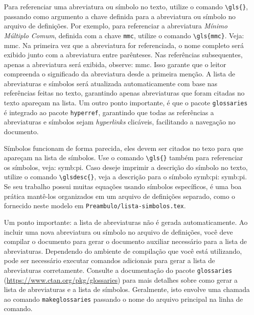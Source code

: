 Para referenciar uma abreviatura ou símbolo no texto, utilize o comando \verb|\gls{}|, passando como
argumento a chave definida para a abreviatura ou símbolo no arquivo de definições. Por exemplo, para
referenciar a abreviatura \emph{Mínimo Múltiplo Comum}, definida com a chave \texttt{mmc}, utilize o
comando \verb|\gls{mmc}|. Veja: \gls{mmc}. Na primeira vez que a abreviatura for referenciada, o
nome completo será exibido junto com a abreviatura entre parênteses. Nas referências subsequentes,
apenas a abreviatura será exibida, observe: \gls{mmc}. Isso garante que o leitor compreenda o
significado da abreviatura desde a primeira menção. A lista de abreviaturas e símbolos será
atualizada automaticamente com base nas referências feitas no texto, garantindo apenas abreviaturas
que foram citadas no texto apareçam na lista. Um outro ponto importante, é que o pacote
\texttt{glossaries} é integrado ao pacote \texttt{hyperref}, garantindo que todas as referências a
abreviaturas e símbolos sejam \emph{hyperlinks} clicáveis, facilitando a navegação no documento.

Símbolos funcionam de forma parecida, eles devem ser citados no texo para que apareçam na lista de
símbolos. Use o comando \verb|\gls{}| também para referenciar os símbolos, veja: \gls{symb:pi}. Caso
deseje imprimir a descrição do símbolo no texto, utilize o comando \verb|\glsdesc{}|, veja a
descrição para o símbolo \gls{symb:pi}: \glsdesc{symb:pi}. Se seu trabalho possui muitas equações
usando símbolos específicos, é uma boa prática mantê-los organizados em um arquivo de definições
separado, como o fornecido neste modelo em \texttt{Preambulo/lista-simbolos.tex}.

Um ponto importante: a lista de abreviaturas não é gerada automaticamente. Ao incluir uma nova
abreviatura ou símbolo no arquivo de definições, você deve compilar o documento para gerar o
documento auxiliar necessário para a lista de abreviaturas. Dependendo do ambiente de compilação que
você está utilizando, pode ser necessário executar comandos adicionais para gerar a lista de
abreviaturas corretamente. Consulte a documentação do pacote \texttt{glossaries}
(\url{https://www.ctan.org/pkg/glossaries}) para mais detalhes sobre como gerar a lista de
abreviaturas e a lista de símbolos. Geralmente, isto envolve uma chamada ao comando
\texttt{makeglossaries} passando o nome do arquivo principal na linha de comando.
